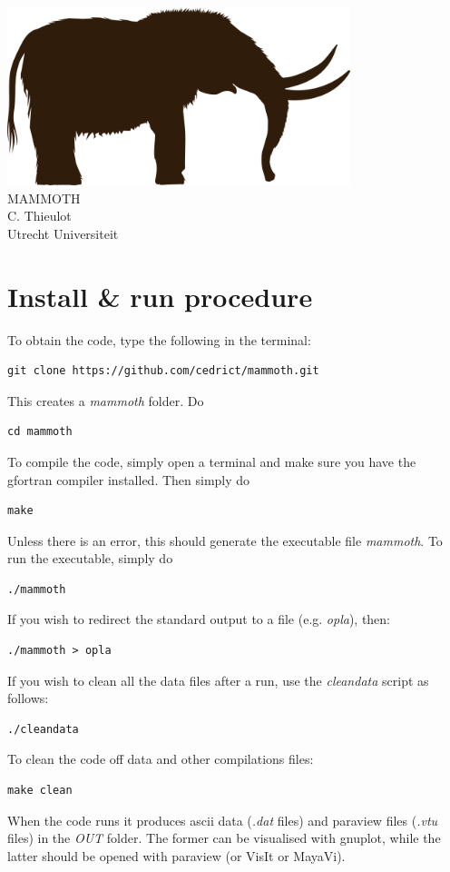 \documentclass[a4paper]{article}
\begin{document}
\begin{center}
\includegraphics[width=10cm]{mammoth}\\
\vspace{4cm}
{\Large MAMMOTH}\\
C. Thieulot\\
Utrecht Universiteit
\end{center}

\newpage
\section{Install \& run procedure}

To obtain the code, type the following in the terminal:
\begin{verbatim}
git clone https://github.com/cedrict/mammoth.git
\end{verbatim}
This creates a {\it mammoth} folder. Do
\begin{verbatim}
cd mammoth
\end{verbatim}
To compile the code, simply open a terminal and make sure you have the gfortran compiler installed.
Then simply do
\begin{verbatim}
make
\end{verbatim}
Unless there is an error, this should generate the executable file {\it mammoth}.
To run the executable, simply do
\begin{verbatim}
./mammoth
\end{verbatim}
If you wish to redirect the standard output to a file (e.g. {\it opla}), then:
\begin{verbatim}
./mammoth > opla
\end{verbatim}
If you wish to clean all the data files after a run, use the {\it cleandata} script as follows:
\begin{verbatim}
./cleandata
\end{verbatim}
To clean the code off data and other compilations files:
\begin{verbatim}
make clean
\end{verbatim}
When the code runs it produces ascii data ({\it *.dat} files) and 
paraview files ({\it *.vtu} files) in the {\sl OUT} folder. 
The former can be visualised with gnuplot, while the latter should be opened
with paraview (or VisIt or MayaVi).
\end{document}
